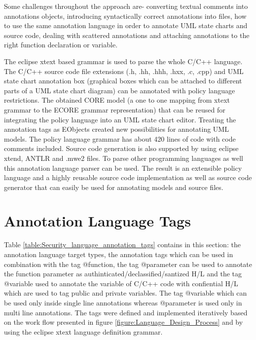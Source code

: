 Some challenges throughout the approach are- converting textual
comments into annotations objects, introducing syntactically
correct annotations into files, how to use the same annotation
language in order to annotate UML state charts and source
code, dealing with scattered annotations and attaching annotations to the right function declaration or variable.

The eclipse xtext based grammar is used to parse the whole C/C++ language. The C/C++ source code file extensions (.h, .hh, .hhh, .hxx, .c, .cpp) and UML state chart annotation box (graphical boxes
which can be attached to different parts of a UML state chart diagram) can be annotated with policy language restrictions. The obtained CORE model (a one to one mapping from xtext grammar to the ECORE grammar representation) that can be reused for integrating the policy language into an UML state chart editor. Treating the annotation tags as EObjects created new possibilities for annotating
UML models. The policy language grammar has about 420 lines of code with code comments included. Source code generation is also supported by using
eclipse xtend, ANTLR and .mwe2 files. To parse other programming languages as well this annotation language parser can be used. The result is an extensible policy language and a highly reusable source code implementation as well as source code generator that can easily be used for annotating models and source files.

\section{Annotation Language Tags}
Table \ref{table:Security_language_annotation_tags} contains in this section: the annotation language
target types, the annotation tags which can be used in
combination with the tag @function, the tag
@parameter can be used to annotate the function parameter as authinticated/declassified/santized H/L and the tag @variable used to annotate the variable of C/C++ code with confiential H/L which are used to tag public and private variables. The tag @variable which can be used only inside single line annotations whereas @parameter is used only in multi line annotations. The tags were
defined and implemented iteratively based on the work flow
presented in figure \ref{figure:Language_Design_Process} and by using the eclipse xtext \cite{ref_17_xtext:grammar} language
definition grammar.

